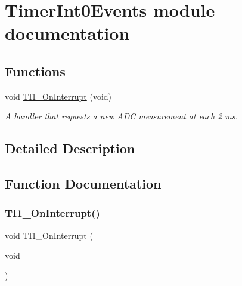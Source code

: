 \hypertarget{group___timer_int0_events__module}{}\section{Timer\+Int0\+Events module documentation}
\label{group___timer_int0_events__module}
\subsection*{Functions}
\begin{DoxyCompactItemize}
\item 
void \hyperlink{group___timer_int0_events__module_ga01b566cf25a21b34152513dcb1321a11}{T\+I1\+\_\+\+On\+Interrupt} (void)
\begin{DoxyCompactList}\small\item\em A handler that requests a new A\+DC measurement at each 2 ms. \end{DoxyCompactList}\end{DoxyCompactItemize}


\subsection{Detailed Description}


\subsection{Function Documentation}
\mbox{\label{group___timer_int0_events__module_ga01b566cf25a21b34152513dcb1321a11}} 
\subsubsection{\texorpdfstring{T\+I1\+\_\+\+On\+Interrupt()}{TI1\_OnInterrupt()}}
{\footnotesize\ttfamily void T\+I1\+\_\+\+On\+Interrupt (\begin{DoxyParamCaption}\item[{void}]{ }\end{DoxyParamCaption})}



